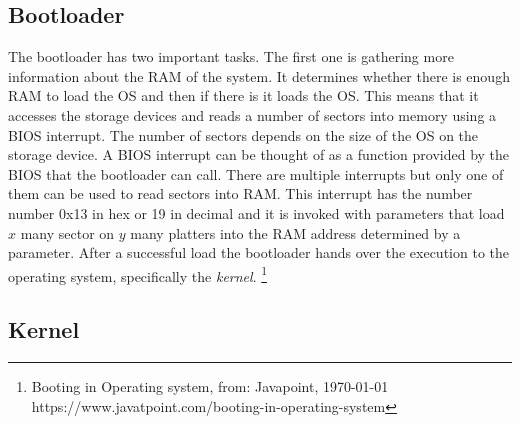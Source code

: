 \subsection{Bootloader}

The bootloader has two important tasks. The first one is gathering more
information about the RAM of the system. It determines whether there is
enough RAM to load the OS and then if there is it loads the OS. 
This means that it accesses the storage devices and reads a number of
sectors into memory using a BIOS interrupt. The number of sectors depends on
the size of the OS on the storage device. A BIOS interrupt can be thought of
as a function provided by the BIOS that the bootloader can call. There are
multiple interrupts but only one of them can be used to read sectors into
RAM. This interrupt has the number number 0x13 in hex or 19 in decimal and it is 
invoked with parameters that load $x$ many sector on $y$ many platters into the RAM
address determined by a parameter. After a successful load the bootloader
hands over the execution to the operating system, specifically the \textit{kernel}.
\footnote{Booting in Operating system, from: Javapoint, \today \\ https://www.javatpoint.com/booting-in-operating-system}

\subsection{Kernel}

